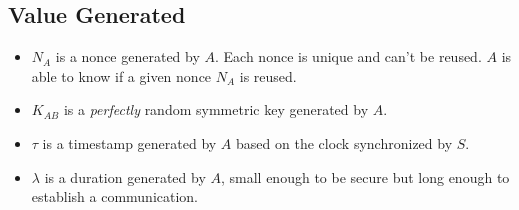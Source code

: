 \subsection{Value Generated}

\begin{itemize}
    \item $N_A$ is a nonce generated by $A$. Each nonce is unique and can't be reused. $A$ is able to know if a given
        nonce $N_A$ is reused.
    \item $K_{AB}$ is a \textit{perfectly} random symmetric key generated by $A$.
    \item $\tau$ is a timestamp generated by $A$ based on the clock synchronized by $S$.
    \item $\lambda$ is a duration generated by $A$, small enough to be secure but long enough to establish a communication.
\end{itemize}
